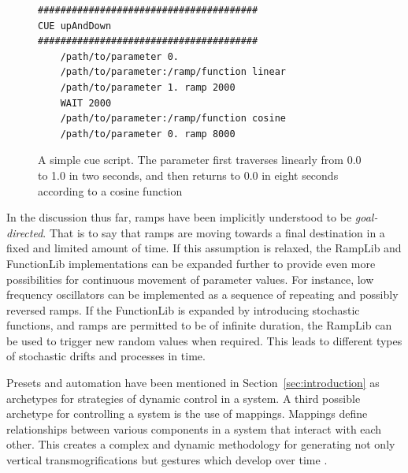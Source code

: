 \documentclass{article}
\begin{document}
\begin{figure}[ht]
\begin{small}
\begin{verbatim}
#######################################
CUE upAndDown
#######################################
	/path/to/parameter 0.
	/path/to/parameter:/ramp/function linear
	/path/to/parameter 1. ramp 2000
	WAIT 2000
	/path/to/parameter:/ramp/function cosine
	/path/to/parameter 0. ramp 8000
\end{verbatim}
\end{small}
\centerline{}
\caption{A simple cue script. The parameter first traverses linearly from 0.0 to 1.0 in two seconds, and then returns to 0.0 in eight seconds according to a cosine function}
\label{fig:cuescript}
\end{figure}

In the discussion thus far, ramps have been implicitly understood to be \emph{goal-directed}.  That is to say that ramps are moving towards a final destination in a fixed and limited amount of time. If this assumption is relaxed, the RampLib and FunctionLib implementations can be expanded further to provide even more possibilities for continuous movement of parameter values. For instance, low frequency oscillators can be implemented as a sequence of repeating and possibly reversed ramps. If the FunctionLib is expanded by introducing stochastic functions, and ramps are permitted to be of infinite duration, the RampLib can be used to trigger new random values when required. This leads to different types of stochastic drifts and processes in time.

Presets and automation have been mentioned in Section~\ref{sec:introduction} as archetypes for strategies of dynamic control in a system. A third possible archetype for controlling a system is the use of mappings. Mappings define relationships between various components in a system that interact with each other. This creates a complex and dynamic methodology for generating not only vertical transmogrifications but gestures which develop over time \cite{Hunt:2003,Nort:2006}.
\end{document}
